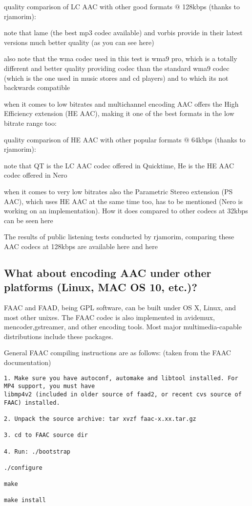 ﻿\documentclass[12pt]{article}
\begin{document}
quality comparison of LC AAC with other good formats $@$ 128kbps (thanks to rjamorim):

note that lame (the best mp3 codec available) and vorbis provide in their latest versions much
better quality (as you can see here)

also note that the wma codec used in this test is wma9 pro, which is a totally different and better
quality providing codec than the standard wma9 codec (which is the one used in music stores and cd
players) and to which its not backwards compatible

when it comes to low bitrates and multichannel encoding AAC offers the High Efficiency extension (HE
AAC), making it one of the best formats in the low bitrate range too:

quality comparison of HE AAC with other popular formats $@$ 64kbps (thanks to rjamorim):

note that QT is the LC AAC codec offered in Quicktime, He is the HE AAC codec offered in Nero

when it comes to very low bitrates also the Parametric Stereo extension (PS AAC), which uses HE AAC
at the same time too, has to be mentioned (Nero is working on an implementation). How it does
compared to other codecs at 32kbps can be seen here

The results of public listening tests conducted by rjamorim, comparing these AAC codecs at 128kbps
are available here and here

\subsection{What about encoding AAC under other platforms (Linux, MAC OS 10, etc.)?}

FAAC and FAAD, being GPL software, can be built under OS X, Linux, and most other unixes. The FAAC
codec is also implemented in avidemux, mencoder,gstreamer, and other encoding tools. Most major
multimedia-capable distributions include these packages.

General FAAC compiling instructions are as follows: (taken from the FAAC documentation)

\begin{lstlisting}
1. Make sure you have autoconf, automake and libtool installed. For MP4 support, you must have
libmp4v2 (included in older source of faad2, or recent cvs source of FAAC) installed.

2. Unpack the source archive: tar xvzf faac-x.xx.tar.gz

3. cd to FAAC source dir

4. Run: ./bootstrap

./configure

make

make install
\end{lstlisting}
\end{document}
